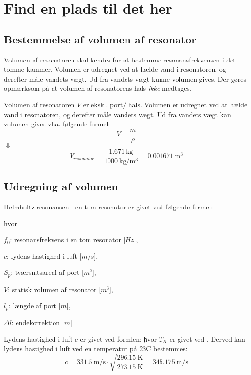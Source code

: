 \chapter{Find en plads til det her}

\section{Bestemmelse af volumen af resonator}

Volumen af resonatoren skal kendes for at bestemme resonansfrekvensen i det tomme kammer. Volumen er udregnet ved at hælde vand i resonatoren, og derefter måle vandets vægt. Ud fra vandets vægt kunne volumen gives. Der gøres opmærksom på at volumen af resonatorens hals \textit{ikke} medtages. 

Volumen af resonatoren $V$ er ekskl. port/ hals. Volumen er udregnet ved at hælde vand i resonatoren, og derefter måle vandets vægt. Ud fra vandets vægt kan volumen gives vha. følgende formel:  
\begin{equation}
  V=\frac{m}{\rho}
  \label{eq:vformel}
\end{equation}
$\Downarrow$
\begin{equation}
V_{resonator}=\frac{\SI{1,671}{\kilo\gram}}{\SI{1000}{\kilo \gram \per \meter^{3}}}={\SI{0,001671}{\meter^{3}}}
\end{equation}


\section{Udregning af volumen}

Helmholtz resonansen i en tom resonator er givet ved følgende formel: \fnul

hvor 
\begin{description}[align=left, labelwidth=1in,labelindent=0.5cm]
\item $f_{0}$: resonansfrekvens i en tom resonator [$Hz$],\\
\item $c$: lydens hastighed i luft [$m/s$],\\
\item $S_{p}$: tværsnitsareal af port [$m^2$],\\
\item $V$: statisk volumen af resonator [$m^3$],\\
\item $l_{p}$: længde af port [$m$],\\
\item $\Delta l$: endekorrektion [$m$]\\
\end{description}
Lydens hastighed i luft $c$ er givet ved formlen: 
\c
hvor $T_{K}$ er givet ved \T. 
Derved kan lydens hastighed i luft ved en temperatur på 23\degree C bestemmes: 
\begin{equation}
		c = {\SI{331,5}{\meter / \second}} \cdot
		\sqrt{\frac{\SI{296,15}{\kelvin}}{\SI{273,15}{\kelvin}}} = {\SI{345,175}{\meter / \second}} 	\end{equation}
		
